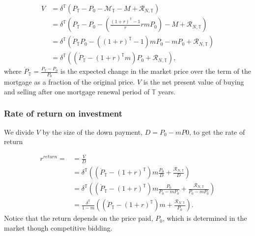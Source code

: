  \begin{align}
V &= \delta^\mathbb{T}\left( P_\mathbb{T}-P_0-\mathcal{M}_{\mathbb{T}}- M+ \mathcal{R}_{N, \mathbb{T}} \right)      \nonumber\\
&= \delta^\mathbb{T}\left( P_\mathbb{T}-P_0- \left(\frac{(1+r)^\mathbb{T}-1}{r}rmP_0\right)- M+ \mathcal{R}_{N, \mathbb{T}} \right)      \nonumber\\
&= \delta^\mathbb{T} \left(
\dot P_\mathbb{T} P_0 -\left((1+r)^\mathbb{T}-1\right)mP_0-mP_0
 +  \mathcal{R}_{N, \mathbb{T}} \right) 
\\
  &= \delta^\mathbb{T} \left((\dot P_\mathbb{T} - (1+r)^\mathbb{T}m) P_0 + \mathcal{R}_{N, \mathbb{T}}\right),\label{eqn_investment_value}
\end{align}
where $\dot P_\mathbb{T}=\frac{P_\mathbb{T}-P_0 }{P_0}$  is the expected  change in the market price over the term of the mortgage as a fraction of the original price.
$V$ is the net present value of buying and selling after one mortgage renewal period of $\mathbb{T}$ years. %


\subsubsection{Rate of return on investment}
We divide $V$ by the size of the down payment, $D=P_0-mP0$, to get the  rate of return  

\begin{align}
r^{return} =
  &= \frac{V}{D}  \nonumber \\
  &= \delta^\mathbb{T} \left((\dot P_\mathbb{T} - (1+r)^\mathbb{T})m \frac{P_0}{D} + \frac{\mathcal{R}_{N, \mathbb{T}}}{D}\right) \nonumber \\
   &= \delta^\mathbb{T} \left((\dot P_\mathbb{T} - (1+r)^\mathbb{T})m \frac{P_0}{P_0-mP_0} + \frac{\mathcal{R}_{N, \mathbb{T}}}{P_0-mP_0}\right) \nonumber \\
  &= \frac{\delta^\mathbb{T}}{1-m} \left((\dot P_\mathbb{T} - (1+r)^\mathbb{T})m  + \frac{\mathcal{R}_{N, \mathbb{T}}}{P_0}\right).\label{eqn-property-investment-return1} 
\end{align}
Notice that the return depends on the price paid, $P_0$, which is determined in the market though competitive bidding.

